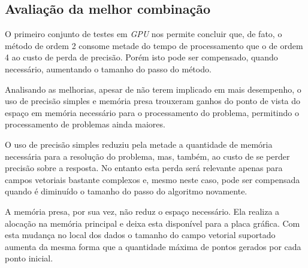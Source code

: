   
  \subsection{Avaliação da melhor combinação}
  O primeiro conjunto de testes em \textit{GPU} nos permite concluir que, de fato, o método de ordem 2 consome metade do tempo de processamento que o de ordem 4 ao custo de perda de precisão. Porém isto pode ser compensado, quando necessário, aumentando o tamanho do passo do método.
  
  Analisando as melhorias, apesar de  não terem implicado em mais desempenho, o uso de precisão simples e memória presa trouxeram ganhos do ponto de vista do espaço em memória necessário para o processamento do problema, permitindo o processamento de problemas ainda maiores.
  
  O uso de precisão simples reduziu pela metade a quantidade de memória necessária para a resolução do problema, mas, também, ao custo de se perder precisão sobre a resposta. No entanto esta perda será relevante apenas para campos vetoriais bastante complexos e, mesmo neste caso, pode ser compensada quando é diminuído o tamanho do passo do algoritmo novamente.
  
  A memória presa, por sua vez, não reduz o espaço necessário. Ela realiza a alocação na memória principal e deixa esta disponível para a placa gráfica. Com esta mudança no local dos dados o tamanho do campo vetorial suportado aumenta da mesma forma que a quantidade máxima de pontos gerados por cada ponto inicial.
